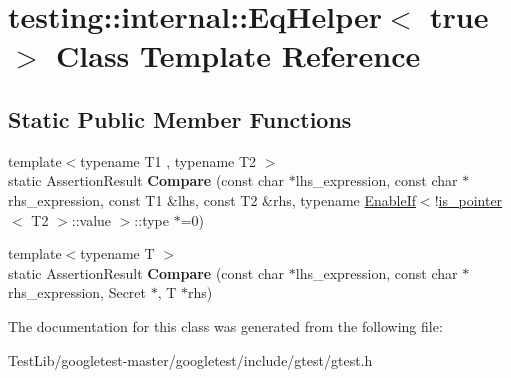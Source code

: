 \hypertarget{classtesting_1_1internal_1_1EqHelper_3_01true_01_4}{}\section{testing\+:\+:internal\+:\+:Eq\+Helper$<$ true $>$ Class Template Reference}
\label{classtesting_1_1internal_1_1EqHelper_3_01true_01_4}
\subsection*{Static Public Member Functions}
\begin{DoxyCompactItemize}
\item 
\mbox{\label{classtesting_1_1internal_1_1EqHelper_3_01true_01_4_a12c7194b2a210b61f06c912eef484ca6}} 
{\footnotesize template$<$typename T1 , typename T2 $>$ }\\static Assertion\+Result {\bfseries Compare} (const char $\ast$lhs\+\_\+expression, const char $\ast$rhs\+\_\+expression, const T1 \&lhs, const T2 \&rhs, typename \hyperlink{structtesting_1_1internal_1_1EnableIf}{Enable\+If}$<$!\hyperlink{structtesting_1_1internal_1_1is__pointer}{is\+\_\+pointer}$<$ T2 $>$\+::value $>$\+::type $\ast$=0)
\item 
\mbox{\label{classtesting_1_1internal_1_1EqHelper_3_01true_01_4_a6f292601a68c8f0d49e6d48bd309b900}} 
{\footnotesize template$<$typename T $>$ }\\static Assertion\+Result {\bfseries Compare} (const char $\ast$lhs\+\_\+expression, const char $\ast$rhs\+\_\+expression, Secret $\ast$, T $\ast$rhs)
\end{DoxyCompactItemize}


The documentation for this class was generated from the following file\+:\begin{DoxyCompactItemize}
\item 
Test\+Lib/googletest-\/master/googletest/include/gtest/gtest.\+h\end{DoxyCompactItemize}
